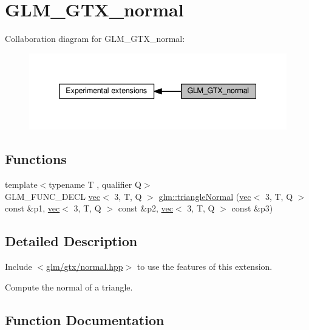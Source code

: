 \hypertarget{group__gtx__normal}{}\section{G\+L\+M\+\_\+\+G\+T\+X\+\_\+normal}
\label{group__gtx__normal}
Collaboration diagram for G\+L\+M\+\_\+\+G\+T\+X\+\_\+normal\+:
\nopagebreak
\begin{figure}[H]
\begin{center}
\leavevmode
\includegraphics[width=338pt]{d1/d47/group__gtx__normal}
\end{center}
\end{figure}
\subsection*{Functions}
\begin{DoxyCompactItemize}
\item 
{\footnotesize template$<$typename T , qualifier Q$>$ }\\G\+L\+M\+\_\+\+F\+U\+N\+C\+\_\+\+D\+E\+CL \hyperlink{structglm_1_1vec}{vec}$<$ 3, T, Q $>$ \hyperlink{group__gtx__normal_gaff1cb5496925dfa7962df457772a7f35}{glm\+::triangle\+Normal} (\hyperlink{structglm_1_1vec}{vec}$<$ 3, T, Q $>$ const \&p1, \hyperlink{structglm_1_1vec}{vec}$<$ 3, T, Q $>$ const \&p2, \hyperlink{structglm_1_1vec}{vec}$<$ 3, T, Q $>$ const \&p3)
\end{DoxyCompactItemize}


\subsection{Detailed Description}
Include $<$\hyperlink{normal_8hpp}{glm/gtx/normal.\+hpp}$>$ to use the features of this extension.

Compute the normal of a triangle. 

\subsection{Function Documentation}
\mbox{\label{group__gtx__normal_gaff1cb5496925dfa7962df457772a7f35}} 
